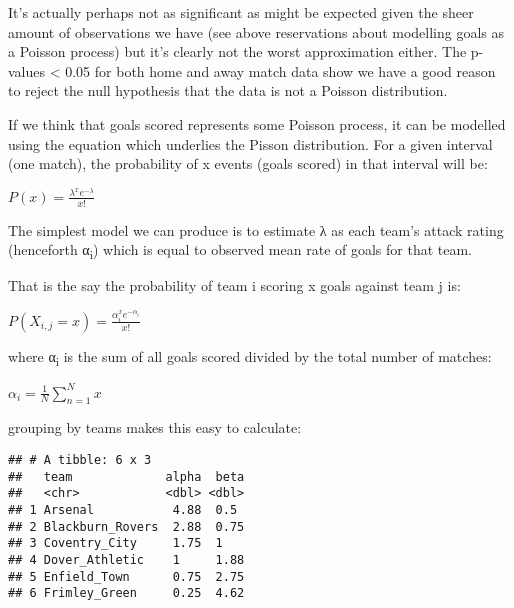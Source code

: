 \documentclass[]{article}
\newenvironment{Shaded}{\begin{snugshade}}{\end{snugshade}}
\newcommand{\KeywordTok}[1]{\textcolor[rgb]{0.13,0.29,0.53}{\textbf{#1}}}
\newcommand{\DataTypeTok}[1]{\textcolor[rgb]{0.13,0.29,0.53}{#1}}
\newcommand{\StringTok}[1]{\textcolor[rgb]{0.31,0.60,0.02}{#1}}
\newcommand{\CommentTok}[1]{\textcolor[rgb]{0.56,0.35,0.01}{\textit{#1}}}
\newcommand{\OperatorTok}[1]{\textcolor[rgb]{0.81,0.36,0.00}{\textbf{#1}}}
\newcommand{\NormalTok}[1]{#1}
\begin{document}
It's actually perhaps not as significant as might be expected given the
sheer amount of observations we have (see above reservations about
modelling goals as a Poisson process) but it's clearly not the worst
approximation either. The p-values \textless{} 0.05 for both home and
away match data show we have a good reason to reject the null hypothesis
that the data is not a Poisson distribution.

If we think that goals scored represents some Poisson process, it can be
modelled using the equation which underlies the Pisson distribution. For
a given interval (one match), the probability of x events (goals scored)
in that interval will be:

\(P(x) = \frac{\lambda^{x}e^{-\lambda}}{x!}\)

The simplest model we can produce is to estimate λ as each team's attack
rating (henceforth α\textsubscript{i}) which is equal to observed mean
rate of goals for that team.

That is the say the probability of team i scoring x goals against team j
is:

\(P(X_{i,j} = x) = \frac{\alpha_{i}^{x}e^{-\alpha_{i}}}{x!}\)

where α\textsubscript{i} is the sum of all goals scored divided by the
total number of matches:

\(\alpha_{i} = \frac{1}{N}\sum_{n=1}^{N} x\)

grouping by teams makes this easy to calculate:

\begin{Shaded}
\end{Shaded}

\begin{verbatim}
## # A tibble: 6 x 3
##   team             alpha  beta
##   <chr>            <dbl> <dbl>
## 1 Arsenal           4.88  0.5 
## 2 Blackburn_Rovers  2.88  0.75
## 3 Coventry_City     1.75  1   
## 4 Dover_Athletic    1     1.88
## 5 Enfield_Town      0.75  2.75
## 6 Frimley_Green     0.25  4.62
\end{verbatim}
\end{document}
